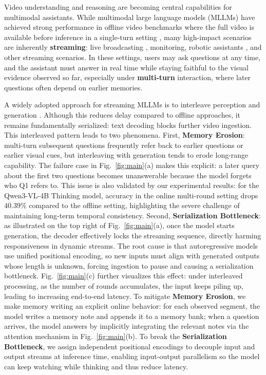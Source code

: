 \documentclass{article}
\begin{document}
Video understanding and reasoning are becoming central capabilities for multimodal assistants. While multimodal large language models (MLLMs) have achieved strong performance in offline video benchmarks where the full video is available before inference in a single-turn setting \cite{DBLP:journals/corr/abs-2511-04570,DBLP:journals/corr/abs-2508-04416,DBLP:journals/corr/abs-2503-21776,DBLP:journals/corr/abs-2501-03230}, many high-impact scenarios are inherently \textbf{streaming}: live broadcasting \cite{DBLP:journals/corr/abs-2511-05299,DBLP:conf/cvpr/ChenZLLMS25}, monitoring, robotic assistants \cite{wang2025streameqastreamingvideounderstanding}, and other streaming scenarios. In these settings, users may ask questions at any time, and the assistant must answer in real time while staying faithful to the visual evidence observed so far, especially under \textbf{multi-turn} interaction, where later questions often depend on earlier memories.

A widely adopted approach for streaming MLLMs is to interleave perception and generation \cite{DBLP:conf/cvpr/ChenLWLSGLGMS24,DBLP:journals/corr/abs-2412-08646,DBLP:conf/cvpr/ChenZLLMS25}. Although this reduces delay compared to offline approaches, it remains fundamentally serialized: text decoding blocks further video ingestion. This interleaved pattern leads to two phenomena.
First, \textbf{Memory Erosion}: multi-turn subsequent questions frequently refer back to earlier questions or earlier visual cues, but interleaving with generation tends to erode long-range capability. The failure case in Fig.~\ref{fig:main}(a) makes this explicit: a later query about the first two questions becomes unanswerable because the model forgets who Q1 refers to. This issue is also validated by our experimental results: for the Qwen3-VL-4B Thinking model, accuracy in the online multi-round setting drops $40.39\%$ compared to the offline setting, highlighting the severe challenge of maintaining long-term temporal consistency.
Second, \textbf{Serialization Bottleneck}: as illustrated on the top right of Fig.~\ref{fig:main}(a), once the model starts generation, the decoder effectively locks the streaming sequence, directly harming responsiveness in dynamic streams. The root cause is that autoregressive models use unified positional encoding, so new inputs must align with generated outputs whose length is unknown, forcing ingestion to pause and causing a serialization bottleneck. Fig.~\ref{fig:main}(c) further visualizes this effect: under interleaved processing, as the number of rounds accumulates, the input keeps piling up, leading to increasing end-to-end latency. To mitigate \textbf{Memory Erosion}, we make memory writing an explicit online behavior: for each observed segment, the model writes a memory note and appends it to a memory bank; when a question arrives, the model answers by implicitly integrating the relevant notes via the attention mechanism in Fig.~\ref{fig:main}(b). To break the \textbf{Serialization Bottleneck}, we assign independent positional encodings to decouple input and output streams at inference time, enabling input-output parallelism so the model can keep watching while thinking and thus reduce latency.
\end{document}
